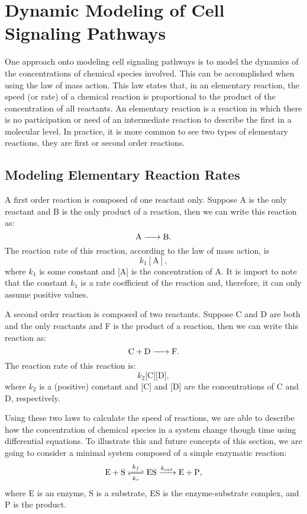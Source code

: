 \section{Dynamic Modeling of Cell Signaling Pathways}
One approach onto modeling cell signaling pathways is to model the 
dynamics of the concentrations of chemical species involved. This can be
accomplished when using the law of mass action. This law states that, 
in an elementary reaction, the speed (or rate) of a chemical reaction is 
proportional to the product of the concentration of all reactants. An 
elementary reaction is a reaction in which there is no participation or 
need of an intermediate reaction to describe the first in a molecular 
level. In practice, it is more common to see two types of elementary 
reactions, they are first or second order reactions. 

\subsection{Modeling Elementary Reaction Rates}
A first order reaction is composed of one reactant only. Suppose A is 
the only reactant and B is the only product of a reaction, then we can
write this reaction as:
\begin{equation*}
\ce{
    A -> B
}.
\end{equation*}
The reaction rate of this reaction, according to the law of mass 
action, is 
\begin{equation*}
    k_1[\text{A}],
\end{equation*}
where $k_1$ is some constant and [A] is the concentration of A. It is
import to note that the constant $k_1$ is a rate coefficient of the 
reaction and, therefore, it can only assume positive values.

A second order reaction is composed of two reactants. Suppose C and D 
are both and the only reactants and F is the product of a reaction, then
we can write this reaction as:
\begin{equation*}
\ce{
    C + D -> F
}.
\end{equation*}
The reaction rate of this reaction is:
\begin{equation*}
    k_2\text{[C][D]},
\end{equation*}
where $k_2$ is a (positive) constant and [C] and [D] are the 
concentrations of C and D, respectively.

Using these two laws to calculate the speed of reactions, we are able 
to describe how the concentration of chemical species in a system change 
though time using differential equations. To illustrate this and future 
concepts of this section, we are going to consider a minimal system 
composed of a simple enzymatic reaction:
\begin{equation}
\ce{
    E + S <=>[\ce{$k$_f}][\ce{$k$_r}] ES ->[\ce{$k_{cat}$}] E + P
},
\label{eq:simple_enzymatic}
\end{equation}
where E is an enzyme, S is a substrate, ES is the enzyme-substrate
complex, and P is the product.

